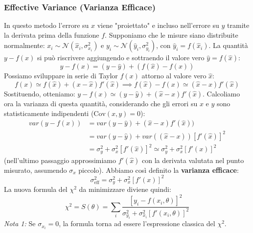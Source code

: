 \documentclass[openany,a4paper,12pt]{book}
\theoremstyle{remark}
\begin{document}
\subsubsection*{Effective Variance (Varianza Efficace)}
In questo metodo l'errore su $x$ viene "proiettato" e incluso nell'errore su $y$ tramite la derivata prima della funzione $f$. 
Supponiamo che le misure siano distribuite normalmente: $x_i \sim \mathcal{N}(\hat{x}_i, \sigma_{x_i}^2)$ e $y_i \sim \mathcal{N}(\hat{y}_i, \sigma_{y_i}^2)$, con $\hat{y}_i = f(\hat{x}_i)$.
La quantità $y - f(x)$ si può riscrivere aggiungendo e sottraendo il valore vero $\hat{y} = f(\hat{x})$:
\begin{equation*}
    y - f(x) = (y - \hat{y}) + (f(\hat{x}) - f(x))
\end{equation*}
Possiamo sviluppare in serie di Taylor $f(x)$ attorno al valore vero $\hat{x}$:
\begin{equation*}
    f(x) \simeq f(\hat{x}) + (x - \hat{x})f'(\hat{x}) \implies f(\hat{x}) - f(x) \simeq (\hat{x} - x)f'(\hat{x})
\end{equation*}
Sostituendo, otteniamo: $y - f(x) \simeq (y - \hat{y}) + (\hat{x} - x)f'(\hat{x})$.
Calcoliamo ora la varianza di questa quantità, considerando che gli errori su $x$ e $y$ sono statisticamente indipendenti ($\mathrm{Cov}(x,y) = 0$):
\begin{align*}
    var(y - f(x)) &= var(y - \hat{y}) + (\hat{x} - x)f'(\hat{x})) \\
    &= var(y - \hat{y}) + var((\hat{x} - x)) [f'(\hat{x})]^2 \\
    &= \sigma_{y}^2 + \sigma_{x}^2 [f'(\hat{x})]^2 \simeq \sigma_{y}^2 + \sigma_{x}^2 [f'(x)]^2
\end{align*}
(nell'ultimo passaggio approssimiamo $f'(\hat{x})$ con la derivata valutata nel punto misurato, assumendo $\sigma_x$ piccolo). Abbiamo così definito la \textbf{varianza efficace}:
\begin{equation}
    \sigma_{\text{eff}}^2 = \sigma_{y}^2 + \sigma_{x}^2[f'(x)]^2
\end{equation}
La nuova formula del $\chi^2$ da minimizzare diviene quindi:
\begin{equation}
    \chi^2 = S(\theta) = \sum_{i} \frac{[y_i - f(x_i, \theta)]^2}{\sigma_{y_i}^2 + \sigma_{x_i}^2 [f'(x_i, \theta)]^2}
\end{equation}
\textit{Nota 1:} Se $\sigma_{x_i} = 0$, la formula torna ad essere l'espressione classica del $\chi^2$.\\
\end{document}
